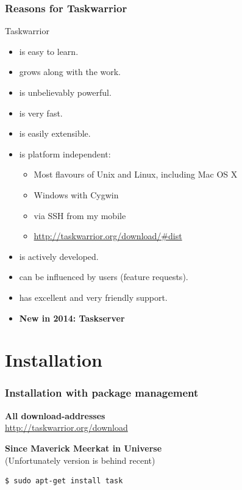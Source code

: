\documentclass[t,handout]{beamer}
\begin{document}
\begin{frame}\frametitle{Reasons for Taskwarrior}
Taskwarrior
\begin{itemize}
	\item is easy to learn.
	\item grows along with the work.
	\item is unbelievably powerful.
	\item is very fast.
	\item is easily extensible. 
	\item is platform independent:
	\begin{itemize}
		\item Most flavours of Unix and Linux, including Mac OS X
		\item Windows with Cygwin
		\item via SSH from my mobile
		\item \url{http://taskwarrior.org/download/\#dist}
	\end{itemize}
	\item is actively developed.
	\item can be influenced by users (feature requests).
	\item has excellent and very friendly support.
	\item \textbf{New in 2014: Taskserver}
\end{itemize}
\end{frame}

\section{Installation}

\begin{frame}[fragile]\frametitle{Installation with package management}
\textbf{All download-addresses} \\
\url{http://taskwarrior.org/download} \pause

\textbf{Since Maverick Meerkat in Universe} \\
(Unfortunately version is behind recent)
\begin{lstlisting}
$ sudo apt-get install task
\end{lstlisting} \pause
\end{frame}
\end{document}
